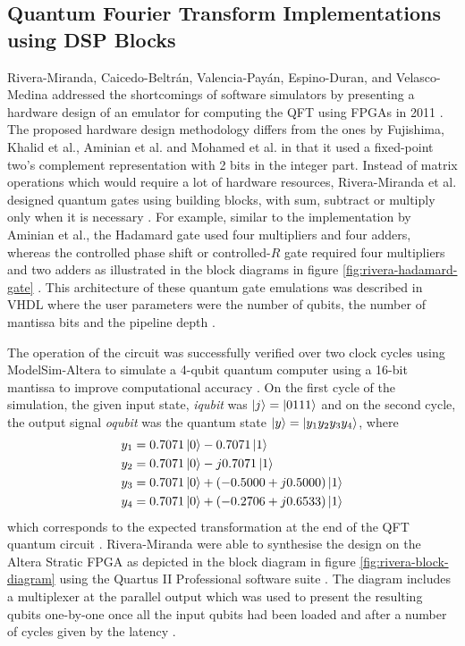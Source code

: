 

\subsection{Quantum Fourier Transform Implementations using DSP Blocks}

Rivera-Miranda, Caicedo-Beltr\'{a}n, Valencia-Pay\'{a}n, Espino-Duran, and Velasco-Medina addressed the shortcomings of software simulators by presenting a hardware design of an emulator for computing the QFT using FPGAs in 2011 \cite{rivera2011hardware}. The proposed hardware design methodology differs from the ones by Fujishima, Khalid et al., Aminian et al. and Mohamed et al. in that it used a fixed-point two's complement representation with 2 bits in the integer part. Instead of matrix operations which would require a lot of hardware resources, Rivera-Miranda et al. designed quantum gates using building blocks, with sum, subtract or multiply only when it is necessary \cite{rivera2011hardware}. For example, similar to the implementation by Aminian et al., the Hadamard gate used four multipliers and four adders, whereas the controlled phase shift or controlled-$R$ gate required four multipliers and two adders as illustrated in the block diagrams in figure \ref{fig:rivera-hadamard-gate} \cite{rivera2011hardware}. This architecture of these quantum gate emulations was described in VHDL where the user parameters were the number of qubits, the number of mantissa bits and the pipeline depth \cite{rivera2011hardware}. 

The operation of the circuit was successfully verified over two clock cycles using ModelSim-Altera to simulate a 4-qubit quantum computer using a 16-bit mantissa to improve computational accuracy \cite{rivera2011hardware}. On the first cycle of the simulation, the given input state, \textit{iqubit} was $\ket{j} = \ket{0111}$ and on the second cycle, the output signal \textit{oqubit} was the quantum state $\ket{y} = \ket{y_1 y_2 y_3 y_4}$, where
\begin{align}
	y_1	 & = 0.7071\ket{0} - 0.7071\ket{1}\nonumber\\
	y_2	 & = 0.7071\ket{0} - j0.7071\ket{1}\nonumber\\
	y_3	 & = 0.7071\ket{0} + (-0.5000 + j0.5000)\ket{1}\nonumber\\
	y_4	 & = 0.7071\ket{0} + (-0.2706 + j0.6533)\ket{1}\nonumber
\end{align}
which corresponds to the expected transformation at the end of the QFT quantum circuit \cite{rivera2011hardware}. Rivera-Miranda were able to synthesise the design on the Altera Stratic FPGA as depicted in the block diagram in figure \ref{fig:rivera-block-diagram} using the Quartus II Professional software suite \cite{rivera2011hardware}. The diagram includes a multiplexer at the parallel output which was used to present the resulting qubits one-by-one once all the input qubits had been loaded and after a number of cycles given by the latency \cite{rivera2011hardware}. 

